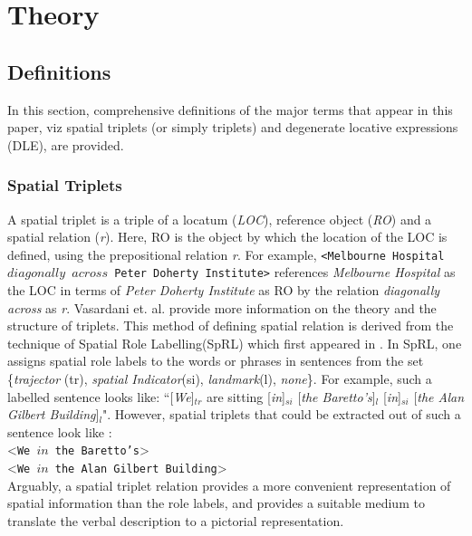 \documentclass{acm_proc_article-sp}
\begin{document}
\section{Theory}
\subsection{Definitions}
In this section, comprehensive definitions of the major terms that appear in this paper, viz spatial triplets (or simply triplets) and degenerate locative expressions (DLE), are provided.
\subsubsection{Spatial Triplets}
A spatial triplet is a triple of a locatum (\textit{LOC}), reference object (\textit{RO}) and a spatial relation (\textit{r}). Here, RO is the object by which the location of the LOC is defined, using the prepositional relation \textit{r}. For example, \texttt{<Melbourne Hospital $diagonally$ $across$ Peter Doherty Institute>} references \textit{Melbourne Hospital} as the LOC in terms of \textit{Peter Doherty Institute} as RO by the relation \textit{diagonally across} as \textit{r}. Vasardani et. al. \cite{maria:descriptions} provide more information on the theory and the structure of triplets. This method of defining spatial relation is derived from the technique of Spatial Role Labelling(SpRL) which first appeared in \cite{Kordjamshidi:labelling}. In SpRL, one assigns spatial role labels to the words or phrases in sentences from the set \{\textit{trajector} (tr), \textit{spatial Indicator}(si), \textit{landmark}(l), \textit{none}\}. For example, such a labelled sentence looks like:
``[\textit{We}]$_{tr}$ are sitting [\textit{in}]$_{si}$ [\textit{the Baretto's}]$_l$ [\textit{in}]$_{si}$ [\textit{the Alan Gilbert Building}]$_{l}$". However, spatial triplets that could be extracted out of such a sentence look like : \\<\texttt{We ${in}$ the Baretto's}> \\<\texttt{We ${in}$ the Alan Gilbert Building}>\\ 
Arguably, a spatial triplet relation provides a more convenient representation of spatial information than the role labels, and provides a suitable medium to translate the verbal description to a pictorial representation. 
\end{document}
